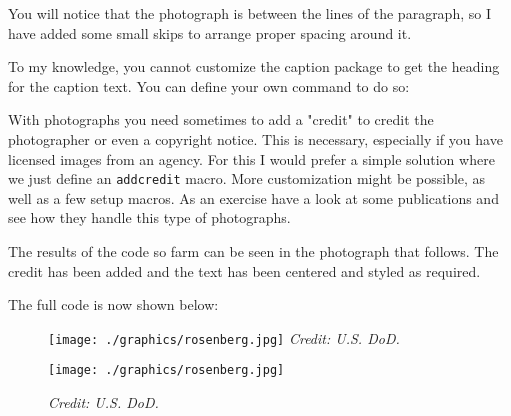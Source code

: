 You will notice that the photograph is between the lines of the paragraph, so I have added some small skips to arrange proper spacing around it.


To my knowledge, you cannot customize the caption package to get the heading for the caption text. You can define your own command to do so:
\begin{phdverbatim}
\newcommand\captionx[2]{\par%
     \leavevmode 
     \caption*{\textsc{#1}\par%
     \textit{#1}}%
}
\end{phdverbatim}

\DeclareDocumentCommand{}

With photographs you need sometimes to add a "credit" to credit the photographer or even a copyright notice. This is necessary, especially if you have licensed images from an agency. For this I would prefer a simple solution where we
just define an \verb+addcredit+ macro. More customization might be possible, as well as a few setup macros. As an exercise have a look at some publications and see how they handle this type of photographs.

\begin{teX}
\newcommand\addcredit[1]{%
   \vspace*{-10.5pt}%
   \hfill\hfill
   \textit{Credit: #1}%
}
\end{teX}

\renewcommand\addcredit[1]{%
 \hfill\hfill\textit{Credit: #1}%
 \vspace{6pt}
}

The results of the code so farm can be seen in the photograph that follows. The credit has been added and
the text has been centered and styled as required.

The full code is now shown below:

\begin{teX}
\begin{figure}[htp]
  \centering
  \captionsetup{skip=0pt,  justification=centering}%
  \texttt{[image: ./graphics/rosenberg.jpg]}%
  \addcredit{U.S. DoD.}%
\end{figure}
\end{teX}

\begin{figure}[htp]
  \centering
  \captionsetup{name=Photo, labelsep=period, skip=0pt, position=top, textfont=scriptsize,    justification=centering}%
\texttt{[image: ./graphics/rosenberg.jpg]}\par
\addcredit{U.S. DoD.}

\vspace{10pt}
\end{figure}

